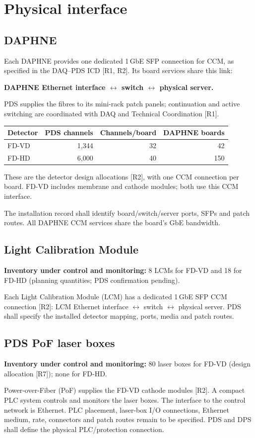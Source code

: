 \section{Physical interface}

\subsection{DAPHNE}
\label{sec:physical-daphne}
Each DAPHNE provides one dedicated 1\,GbE SFP connection for CCM, as specified
in the DAQ--PDS ICD [R1, R2]. Its board services share this link:
\begin{center}
\textbf{DAPHNE Ethernet interface $\longleftrightarrow$ switch
$\longleftrightarrow$ physical server.}
\end{center}
PDS supplies the fibres to its mini-rack patch panels; continuation and active
switching are coordinated with DAQ and Technical Coordination [R1].

\begin{center}
\begin{tabular}{lrrr}
\toprule
\textbf{Detector} & \textbf{PDS channels} & \textbf{Channels/board} & \textbf{DAPHNE boards} \\
\midrule
FD-VD & 1,344 & 32 & 42 \\
FD-HD & 6,000 & 40 & 150 \\
\bottomrule
\end{tabular}
\end{center}
These are the detector design allocations [R2], with one CCM connection per
board. FD-VD includes membrane and cathode modules; both use this CCM interface.


The installation record shall identify board/switch/server ports, SFPs and
patch routes. All DAPHNE CCM services share the board's GbE bandwidth.

\subsection{Light Calibration Module}
\label{sec:physical-calibration}
\textbf{Inventory under control and monitoring:} 8 LCMs for FD-VD and 18 for
FD-HD (planning quantities; PDS confirmation pending).

Each Light Calibration Module (LCM) has a dedicated 1\,GbE
SFP CCM connection [R2]: LCM Ethernet interface $\longleftrightarrow$ switch
$\longleftrightarrow$ physical server. PDS shall specify the installed
detector mapping, ports, media and patch routes.

\subsection{PDS PoF laser boxes}
\label{sec:physical-pof}
\textbf{Inventory under control and monitoring:} 80 laser boxes for FD-VD
(design allocation [R7]); none for FD-HD.

Power-over-Fiber (PoF) supplies the FD-VD cathode modules [R2]. A compact PLC
system controls and monitors the laser boxes. The interface to the control
network is Ethernet. PLC placement, laser-box I/O connections, Ethernet medium,
rate, connectors and patch routes remain to be specified. PDS and DPS shall
define the physical PLC/protection connection.
